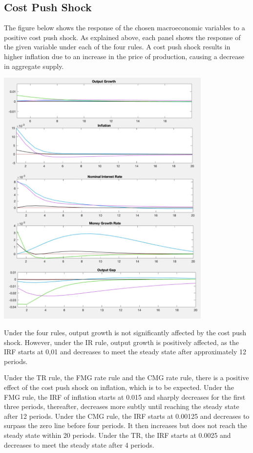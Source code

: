 \documentclass[11pt,preprint, authoryear]{elsarticle}
\let\origfigure\figure
\let\endorigfigure\endfigure
\renewenvironment{figure}[1][2] {
    \expandafter\origfigure\expandafter[H]
} {
    \endorigfigure
}
\numberwithin{equation}{section}
\numberwithin{figure}{section}
\numberwithin{table}{section}
\begin{document}
\hypertarget{cost-push-shock}{%
\subsection{Cost Push Shock}\label{cost-push-shock}}

The figure below shows the response of the chosen macroeconomic
variables to a positive cost push shock. As explained above, each panel
shows the response of the given variable under each of the four rules. A
cost push shock results in higher inflation due to an increase in the
price of production, causing a decrease in aggregate supply.

\begin{figure}
\centering
\includegraphics[width=0.8\textwidth,height=0.6\textheight]{./figures/cost-push-shock.jpeg}
\caption{Plots of Impulse Response Functions for a Cost Push Shock}
\end{figure}

Under the four rules, output growth is not significantly affected by the
cost push shock. However, under the IR rule, output growth is positively
affected, as the IRF starts at 0,01 and decreases to meet the steady
state after approximately 12 periods.

Under the TR rule, the FMG rate rule and the CMG rate rule, there is a
positive effect of the cost push shock on inflation, which is to be
expected. Under the FMG rule, the IRF of inflation starts at 0.015 and
sharply decreases for the first three periods, thereafter, decreases
more subtly until reaching the steady state after 12 periods. Under the
CMG rule, the IRF starts at 0.00125 and decreases to surpass the zero
line before four periods. It then increases but does not reach the
steady state within 20 periods. Under the TR, the IRF starts at 0.0025
and decreases to meet the steady state after 4 periods.
\end{document}
